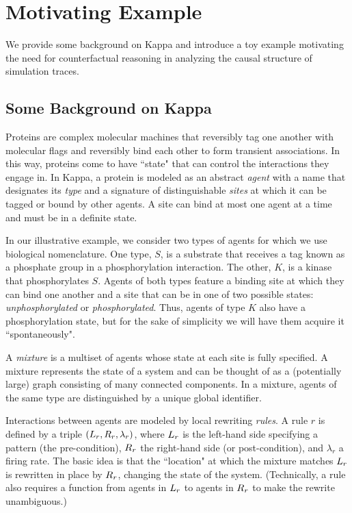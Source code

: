 
\section{Motivating Example}\label{sec:example}

We provide some background on Kappa and introduce a toy
example motivating the need for counterfactual reasoning in analyzing
the causal structure of simulation traces.

\subsection{Some Background on Kappa}\label{sec:background}

Proteins are complex molecular machines that reversibly tag one
another with molecular flags and reversibly bind each other to form
transient associations.  In this way, proteins come to have ``state"
that can control the interactions they engage in. In Kappa, a protein
is modeled as an abstract \emph{agent} with a name that designates its
\emph{type} and a signature of distinguishable \emph{sites} at which
it can be tagged or bound by other agents. A site can bind at most one
agent at a time and must be in a definite state.

In our illustrative example, we consider two types of agents for which
we use biological nomenclature. One type, $S$, is a substrate that
receives a tag known as a phosphate group in a phosphorylation
interaction. The other, $K$, is a kinase that phosphorylates
$S$. Agents of both types feature a binding site at which they can
bind one another and a site that can be in one of two possible states:
\emph{unphosphorylated} or \emph{phosphorylated}. Thus, agents of type
$K$ also have a phosphorylation state, but for the sake of simplicity
we will have them acquire it ``spontaneously".

A \emph{mixture} is a multiset of agents whose state at each site is
fully specified. A mixture represents the state of a system and can be
thought of as a (potentially large) graph consisting of many connected
components. In a mixture, agents of the same type are distinguished by
a unique global identifier. %



Interactions between agents are modeled by local rewriting
\emph{rules}.  A rule $r$ is defined by a triple
$(L_{r}, R_{r}, \lambda_r)$, where $L_{r}$ is the left-hand
side specifying a pattern (the pre-condition), $R_{r}$ the
right-hand side (or post-condition), and $\lambda_r$ a firing rate.
The basic idea is that the ``location" at which the mixture matches
$L_{r}$ is rewritten in place by $R_{r}$, changing the state of
the system. (Technically, a rule also requires a function from agents
in $L_{r}$ to agents in $R_{r}$ to make the rewrite
unambiguous.)

